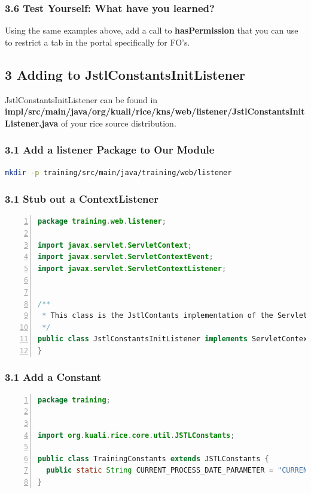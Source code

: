 \subsubsection*{3.6 Test Yourself: What have you learned?}
Using the same examples above, add a call to \textbf{hasPermission} that
you can use to restrict a tab in the portal specifically for FO's.

\subsection*{3 Adding to JstlConstantsInitListener}
JstlConstantsInitListener can be found in
\textbf{impl/src/main/java/org/kuali/rice/kns/web/listener/JstlConstantsInitListener.java}
of your rice source distribution.

\subsubsection*{3.1 Add a listener Package to Our Module}

\begin{lstlisting}[basicstyle=\scriptsize,language=bash,backgroundcolor=\color{ubergray},caption={Directory creation for Linux
    users},frame=single,breaklines=true]
  mkdir -p training/src/main/java/training/web/listener
\end{lstlisting}

\subsubsection*{3.1 Stub out a ContextListener}
\begin{lstlisting}[basicstyle=\scriptsize,numbers=left,language=java,backgroundcolor=\color{ubergray},caption={training/web/TrainingFunctions},frame=single,breaklines=true]
package training.web.listener;

import javax.servlet.ServletContext;
import javax.servlet.ServletContextEvent;
import javax.servlet.ServletContextListener;


/**
 * This class is the JstlContants implementation of the ServletContextListener.
 */
public class JstlConstantsInitListener implements ServletContextListener {
}
\end{lstlisting}


\subsubsection*{3.1 Add a Constant}
\begin{lstlisting}[basicstyle=\scriptsize,numbers=left,language=java,backgroundcolor=\color{ubergray},caption={training/web/TrainingFunctions},frame=single,breaklines=true]
package training;


import org.kuali.rice.core.util.JSTLConstants;

public class TrainingConstants extends JSTLConstants {
  public static String CURRENT_PROCESS_DATE_PARAMETER = "CURRENT_PROCESS_DATE";
}
\end{lstlisting}

